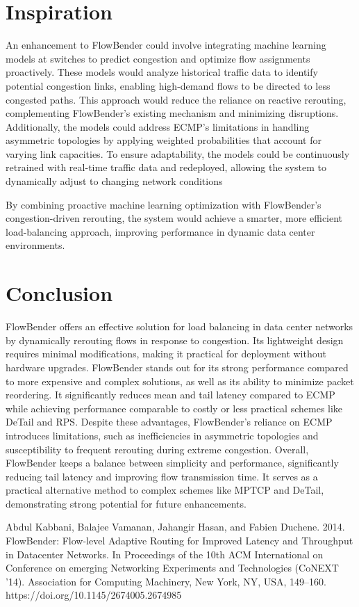 \documentclass[11pt, sigplan]{acmart}
\begin{document}
\section{Inspiration}
An enhancement to FlowBender could involve integrating machine learning models at switches to predict congestion and optimize flow assignments proactively. These models would analyze historical traffic data to identify potential congestion links, enabling high-demand flows to be directed to less congested paths. This approach would reduce the reliance on reactive rerouting, complementing FlowBender's existing mechanism and minimizing disruptions. Additionally, the models could address ECMP's limitations in handling asymmetric topologies by applying weighted probabilities that account for varying link capacities. To ensure adaptability, the models could be continuously retrained with real-time traffic data and redeployed, allowing the system to dynamically adjust to changing network conditions

By combining proactive machine learning optimization with FlowBender’s congestion-driven rerouting, the system would achieve a smarter, more efficient load-balancing approach, improving performance in dynamic data center environments.

\section{Conclusion}
FlowBender offers an effective solution for load balancing in data center networks by dynamically rerouting flows in response to congestion. Its lightweight design requires minimal modifications, making it practical for deployment without hardware upgrades. FlowBender stands out for its strong performance compared to more expensive and complex solutions, as well as its ability to minimize packet reordering. It significantly reduces mean and tail latency compared to ECMP while achieving performance comparable to costly or less practical schemes like DeTail and RPS. Despite these advantages, FlowBender’s reliance on ECMP introduces limitations, such as inefficiencies in asymmetric topologies and susceptibility to frequent rerouting during extreme congestion. Overall, FlowBender keeps a balance between simplicity and performance, significantly reducing tail latency and improving flow transmission time. It serves as a practical alternative method to complex schemes like MPTCP and DeTail, demonstrating strong potential for future enhancements.

\begin{thebibliography}{1}

Abdul Kabbani, Balajee Vamanan, Jahangir Hasan, and Fabien Duchene. 2014. FlowBender: Flow-level Adaptive Routing for Improved Latency and Throughput in Datacenter Networks. In Proceedings of the 10th ACM International on Conference on emerging Networking Experiments and Technologies (CoNEXT '14). Association for Computing Machinery, New York, NY, USA, 149–160. https://doi.org/10.1145/2674005.2674985

\end{thebibliography}
\end{document}

